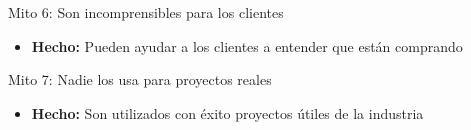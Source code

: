 \documentclass{beamer}
\begin{document}
\begin{frame}{Mito 6: Son incomprensibles para los clientes}
\begin{itemize}[<+->]
\item \textbf{Hecho:} Pueden ayudar a los clientes a entender que est\'an comprando
\end{itemize}
\end{frame}
 
\begin{frame}{Mito 7: Nadie los usa para proyectos reales}
\begin{itemize}[<+->]
\item \textbf{Hecho:} Son utilizados con \'exito proyectos \'utiles de la industria
\end{itemize}
\end{frame}
\end{document}
